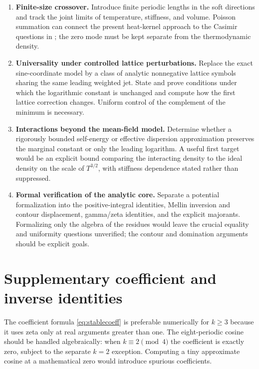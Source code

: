 \documentclass[11pt,a4paper]{article}
\numberwithin{equation}{section}
\theoremstyle{definition}
\begin{document}
\begin{enumerate}[label=\textbf{\arabic*.},leftmargin=*]
\item \textbf{Finite-size crossover.}
Introduce finite periodic lengths in the soft directions and track
the joint limits of temperature, stiffness, and volume. Poisson
summation can connect the present heat-kernel approach to the Casimir
questions in \cite{LJ2020,PruszczykJakubczyk2023}; the zero mode must
be kept separate from the thermodynamic density.

\item \textbf{Universality under controlled lattice perturbations.}
Replace the exact sine-coordinate model by a class of analytic
nonnegative lattice symbols sharing the same leading weighted jet.
State and prove conditions under which the logarithmic constant is
unchanged and compute how the first lattice correction changes.
Uniform control of the complement of the minimum is necessary.

\item \textbf{Interactions beyond the mean-field model.}
Determine whether a rigorously bounded self-energy or effective
dispersion approximation preserves the marginal constant or only the
leading logarithm. A useful first target would be an explicit bound
comparing the interacting density to the ideal density on the scale
of $T^{3/2}$, with stiffness dependence stated rather than suppressed.

\item \textbf{Formal verification of the analytic core.}
Separate a potential formalization into the positive-integral
identities, Mellin inversion and contour displacement, gamma/zeta
identities, and the explicit majorants. Formalizing only the algebra
of the residues would leave the crucial equality and uniformity
questions unverified; the contour and domination arguments should
be explicit goals.
\end{enumerate}

\appendix
\section{Supplementary coefficient and inverse identities}

The coefficient formula \eqref{eq:stablecoeff} is preferable numerically
for $k\ge3$ because it uses zeta only at real arguments greater than
one. The eight-periodic cosine should be handled algebraically:
when $k\equiv2\pmod4$ the coefficient is exactly zero, subject to the
separate $k=2$ exception. Computing a tiny approximate cosine at a
mathematical zero would introduce spurious coefficients.
\end{document}
